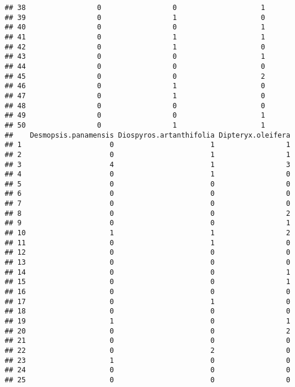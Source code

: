 \documentclass[
]{article}
\begin{document}
\begin{verbatim}
## 38                 0                 0                    1
## 39                 0                 1                    0
## 40                 0                 0                    1
## 41                 0                 1                    1
## 42                 0                 1                    0
## 43                 0                 0                    1
## 44                 0                 0                    0
## 45                 0                 0                    2
## 46                 0                 1                    0
## 47                 0                 1                    0
## 48                 0                 0                    0
## 49                 0                 0                    1
## 50                 0                 1                    1
##    Desmopsis.panamensis Diospyros.artanthifolia Dipteryx.oleifera
## 1                     0                       1                 1
## 2                     0                       1                 1
## 3                     4                       1                 3
## 4                     0                       1                 0
## 5                     0                       0                 0
## 6                     0                       0                 0
## 7                     0                       0                 0
## 8                     0                       0                 2
## 9                     0                       0                 1
## 10                    1                       1                 2
## 11                    0                       1                 0
## 12                    0                       0                 0
## 13                    0                       0                 0
## 14                    0                       0                 1
## 15                    0                       0                 1
## 16                    0                       0                 0
## 17                    0                       1                 0
## 18                    0                       0                 0
## 19                    1                       0                 1
## 20                    0                       0                 2
## 21                    0                       0                 0
## 22                    0                       2                 0
## 23                    1                       0                 0
## 24                    0                       0                 0
## 25                    0                       0                 0

\end{verbatim}
\end{document}

